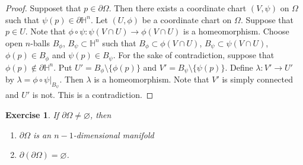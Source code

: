 \documentclass[12pt]{amsart}
\newtheorem{ex}[thm]{Exercise}
\newcommand{\lam}{\lambda}
\newcommand{\Om}{\Omega}
\renewcommand{\H}{\mathbb{H}}
\begin{document}
	\begin{proof}
		Supposet that $p \in \partial \Om$. Then there exists a coordinate chart $(V, \psi)$ on $\Om$ such that $\psi(p) \in \partial \H^n$. Let $(U, \phi)$ be a coordinate chart on $\Om$. Suppose that $p \in U$. Note that $\phi \circ \psi : \psi(V \cap U) \rightarrow \phi(V \cap U)$ is a homeomorphism. Choose open $n$-balls $B_{\phi}$, $B_{\psi} \subset \H^n$ such that $B_{\phi} \subset \phi(V \cap U)$, $B_{\psi} \subset \psi(V \cap U)$, $\phi(p) \in B_{\phi}$ and $\psi(p) \in B_{\psi}$. For the sake of contradiction, suppose that $\phi(p) \not \in \partial \H^n$. Put $ U' = B_{\phi} \setminus \{\phi(p)\}$ and $V' = B_{\psi} \setminus \{\psi(p)\}$. Define $\lam: V' \rightarrow U'$ by $\lam = \phi \circ \psi|_{B_{\psi}}$. Then $\lam$ is a homeomorphism. Note that $V'$ is simply connected and $U'$ is not. This is a contradiction. 
	\end{proof}

	\begin{ex}
		If $\partial \Om \neq \varnothing$, then 
		\begin{enumerate}
			\item $\partial \Om$ is an $n-1$-dimensional manifold \item $\partial (\partial \Om) = \varnothing$.
		\end{enumerate}
	\end{ex}
\end{document}
